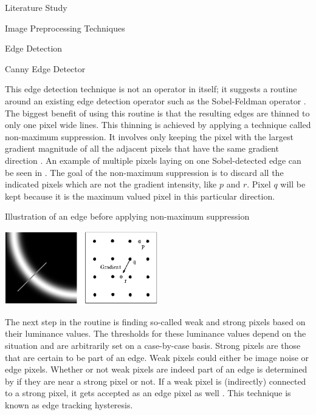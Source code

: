 \documentclass{matthijs}
\begin{document}
\begin{hoofdstuk}{Literature Study}
\begin{paragraaf}{Image Preprocessing Techniques}
\begin{subparagraaf}{Edge Detection}
				\begin{subsubparagraaf}{Canny Edge Detector}

					This edge detection technique is not an operator in itself; it suggests a routine around an existing edge detection operator such as the Sobel-Feldman operator \cite{canny1986computational}.
					The biggest benefit of using this routine is that the resulting edges are thinned to only one pixel wide lines.
					This thinning is achieved by applying a technique called non-maximum suppression.
					It involves only keeping the pixel with the largest gradient magnitude of all the adjacent pixels that have the same gradient direction \cite{sarab2020canny}.
					An example of multiple pixels laying on one Sobel-detected edge can be seen in .
					The goal of the non-maximum suppression is to discard all the indicated pixels which are not the gradient intensity, like $p$ and $r$.
					Pixel $q$ will be kept because it is the maximum valued pixel in this particular direction.
					
					\begin{figuur}{Illustration of an edge before applying non-maximum suppression}

						\includegraphics[width=0.5\textwidth]{teli2019canny-img1.png}
						\cite{teli2019canny}

					\end{figuur}

					The next step in the routine is finding so-called weak and strong pixels based on their luminance values.
					The thresholds for these luminance values depend on the situation and are arbitrarily set on a case-by-case basis.
					Strong pixels are those that are certain to be part of an edge.
					Weak pixels could either be image noise or edge pixels.
					Whether or not weak pixels are indeed part of an edge is determined by if they are near a strong pixel or not.
					If a weak pixel is (indirectly) connected to a strong pixel, it gets accepted as an edge pixel as well \cite{canny1986computational}.
					This technique is known as edge tracking hysteresis.


\end{subsubparagraaf}
\end{subparagraaf}
\end{paragraaf}
\end{hoofdstuk}
\end{document}
